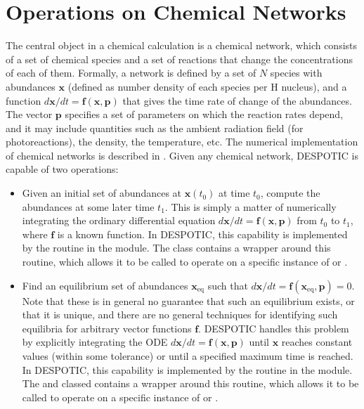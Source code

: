 \documentclass[letterpaper,10pt,english]{sphinxmanual}
\begin{document}
\section{Operations on Chemical Networks}
\label{chemistry:operations-on-chemical-networks}\label{chemistry:ssec-operations}
The central object in a chemical calculation is a chemical network,
which consists of a set of chemical species and a set of reactions
that change the concentrations of each of them. Formally, a network is
defined by a set of \(N\) species with abundances
\(\mathbf{x}\) (defined as number density of each species per H
nucleus), and a function \(d\mathbf{x}/dt = \mathbf{f}(\mathbf{x},
\mathbf{p})\) that gives the time rate of change of the abundances. The
vector \(\mathbf{p}\) specifies a set of parameters on which the
reaction rates depend, and it may include quantities such as the
ambient radiation field (for photoreactions), the density, the
temperature, etc. The numerical implementation of chemical networks is
described in {\hyperref[chemistry:ssec\string-chemnetworks]{}}. Given any chemical network,
DESPOTIC is capable of two operations:
\begin{itemize}
\item {} 
Given an initial set of abundances at \(\mathbf{x}(t_0)\) at
time \(t_0\), compute the abundances at some later time
\(t_1\). This is simply a matter of numerically integrating the
ordinary differential equation \(d\mathbf{x}/dt =
\mathbf{f}(\mathbf{x},\mathbf{p})\) from \(t_0\) to \(t_1\),
where \(\mathbf{f}\) is a known function. In DESPOTIC, this
capability is implemented by the routine  in the
 module. The  class
contains a wrapper around this routine, which allows it to be
called to operate on a specific instance of  or
.

\item {} 
Find an equilibrium set of abundances
\(\mathbf{x}_{\mathrm{eq}}\) such that \(d\mathbf{x}/dt =
\mathbf{f}(\mathbf{x}_{\mathrm{eq}}, \mathbf{p}) = 0\). Note that
these is in general no guarantee that such an equilibrium exists, or
that it is unique, and there are no general techniques for
identifying such equilibria for arbitrary vector functions
\(\mathbf{f}\). DESPOTIC handles this problem by explicitly
integrating the ODE \(d\mathbf{x}/dt =
\mathbf{f}(\mathbf{x},\mathbf{p})\) until \(\mathbf{x}\) reaches
constant values (within some tolerance) or until a specified maximum
time is reached. In DESPOTIC, this capability is implemented by
the routine  in the 
module. The  and  classed contains a wrapper
around this routine, which allows it to be called to operate on a
specific instance of  or .

\end{itemize}
\end{document}
